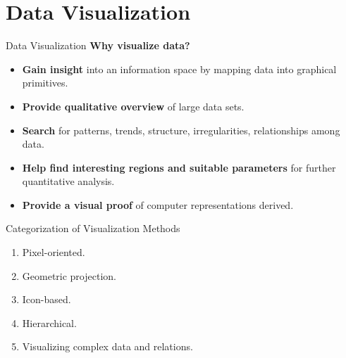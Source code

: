 \section{Data Visualization}

\begin{frame}{Data Visualization}
  \textbf{Why visualize data?}
  \begin{itemize}
  \item \textbf{Gain insight} into an information space by mapping data into graphical primitives.
  \item \textbf{Provide qualitative overview} of large data sets.
  \item \textbf{Search} for patterns, trends, structure, irregularities, relationships among data.
  \item \textbf{Help find interesting regions and suitable parameters} for further quantitative analysis.
  \item \textbf{Provide a visual proof} of computer representations derived.
  \end{itemize}
\end{frame}

\begin{frame}{Categorization of Visualization Methods}
  \begin{enumerate}
  \item Pixel-oriented.
  \item Geometric projection.
  \item Icon-based.
  \item Hierarchical.
  \item Visualizing complex data and relations.
  \end{enumerate}
\end{frame}

